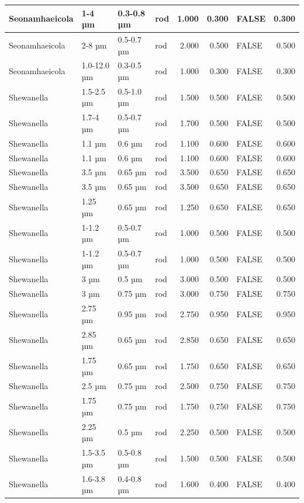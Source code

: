 \documentclass[
]{article}
\begin{document}
\begin{table}
\begin{tabular}{l|l|l|l|r|r|l|r}
Seonamhaeicola & 1-4 µm & 0.3-0.8 µm & rod & 1.000 & 0.300 & FALSE & 0.300\\
\hline
Seonamhaeicola & 2-8 µm & 0.5-0.7 µm & rod & 2.000 & 0.500 & FALSE & 0.500\\
\hline
Seonamhaeicola & 1.0-12.0 µm & 0.3-0.5 µm & rod & 1.000 & 0.300 & FALSE & 0.300\\
\hline
Shewanella & 1.5-2.5 µm & 0.5-1.0 µm & rod & 1.500 & 0.500 & FALSE & 0.500\\
\hline
Shewanella & 1.7-4 µm & 0.5-0.7 µm & rod & 1.700 & 0.500 & FALSE & 0.500\\
\hline
Shewanella & 1.1 µm & 0.6 µm & rod & 1.100 & 0.600 & FALSE & 0.600\\
\hline
Shewanella & 1.1 µm & 0.6 µm & rod & 1.100 & 0.600 & FALSE & 0.600\\
\hline
Shewanella & 3.5 µm & 0.65 µm & rod & 3.500 & 0.650 & FALSE & 0.650\\
\hline
Shewanella & 3.5 µm & 0.65 µm & rod & 3.500 & 0.650 & FALSE & 0.650\\
\hline
Shewanella & 1.25 µm & 0.65 µm & rod & 1.250 & 0.650 & FALSE & 0.650\\
\hline
Shewanella & 1-1.2 µm & 0.5-0.7 µm & rod & 1.000 & 0.500 & FALSE & 0.500\\
\hline
Shewanella & 1-1.2 µm & 0.5-0.7 µm & rod & 1.000 & 0.500 & FALSE & 0.500\\
\hline
Shewanella & 3 µm & 0.5 µm & rod & 3.000 & 0.500 & FALSE & 0.500\\
\hline
Shewanella & 3 µm & 0.75 µm & rod & 3.000 & 0.750 & FALSE & 0.750\\
\hline
Shewanella & 2.75 µm & 0.95 µm & rod & 2.750 & 0.950 & FALSE & 0.950\\
\hline
Shewanella & 2.85 µm & 0.65 µm & rod & 2.850 & 0.650 & FALSE & 0.650\\
\hline
Shewanella & 1.75 µm & 0.65 µm & rod & 1.750 & 0.650 & FALSE & 0.650\\
\hline
Shewanella & 2.5 µm & 0.75 µm & rod & 2.500 & 0.750 & FALSE & 0.750\\
\hline
Shewanella & 1.75 µm & 0.75 µm & rod & 1.750 & 0.750 & FALSE & 0.750\\
\hline
Shewanella & 2.25 µm & 0.5 µm & rod & 2.250 & 0.500 & FALSE & 0.500\\
\hline
Shewanella & 1.5-3.5 µm & 0.5-0.8 µm & rod & 1.500 & 0.500 & FALSE & 0.500\\
\hline
Shewanella & 1.6-3.8 µm & 0.4-0.8 µm & rod & 1.600 & 0.400 & FALSE & 0.400\\

\end{tabular}
\end{table}
\end{document}
